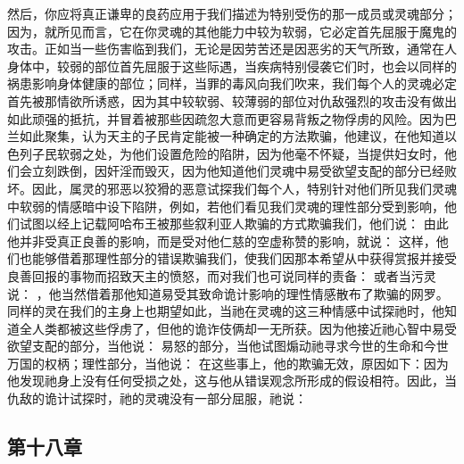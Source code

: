 然后，你应将真正谦卑的良药应用于我们描述为特别受伤的那一成员或灵魂部分；因为，就所见而言，它在你灵魂的其他能力中较为软弱，它必定首先屈服于魔鬼的攻击。正如当一些伤害临到我们，无论是因劳苦还是因恶劣的天气所致，通常在人身体中，较弱的部位首先屈服于这些际遇，当疾病特别侵袭它们时，也会以同样的祸患影响身体健康的部位；同样，当罪的毒风向我们吹来，我们每个人的灵魂必定首先被那情欲所诱惑，因为其中较软弱、较薄弱的部位对仇敌强烈的攻击没有做出如此顽强的抵抗，并冒着被那些因疏忽大意而更容易背叛之物俘虏的风险。因为巴兰如此聚集，认为天主的子民肯定能被一种确定的方法欺骗，他建议，在他知道以色列子民软弱之处，为他们设置危险的陷阱，因为他毫不怀疑，当提供妇女时，他们会立刻跌倒，因奸淫而毁灭，因为他知道他们灵魂中易受欲望支配的部分已经败坏。因此，属灵的邪恶以狡猾的恶意试探我们每个人，特别针对他们所见我们灵魂中软弱的情感暗中设下陷阱，例如，若他们看见我们灵魂的理性部分受到影响，他们试图以经上记载阿哈布王被那些叙利亚人欺骗的方式欺骗我们，他们说： 由此他并非受真正良善的影响，而是受对他仁慈的空虚称赞的影响，就说： 这样，他们也能够借着那理性部分的错误欺骗我们，使我们因那本希望从中获得赏报并接受良善回报的事物而招致天主的愤怒，而对我们也可说同样的责备： 或者当污灵说： ，他当然借着那他知道易受其致命诡计影响的理性情感散布了欺骗的网罗。同样的灵在我们的主身上也期望如此，当祂在灵魂的这三种情感中试探祂时，他知道全人类都被这些俘虏了，但他的诡诈伎俩却一无所获。因为他接近祂心智中易受欲望支配的部分，当他说： 易怒的部分，当他试图煽动祂寻求今世的生命和今世万国的权柄；理性部分，当他说： 在这些事上，他的欺骗无效，原因如下：因为他发现祂身上没有任何受损之处，这与他从错误观念所形成的假设相符。因此，当仇敌的诡计试探时，祂的灵魂没有一部分屈服，祂说： \par


\subsection{第十八章}

\par

